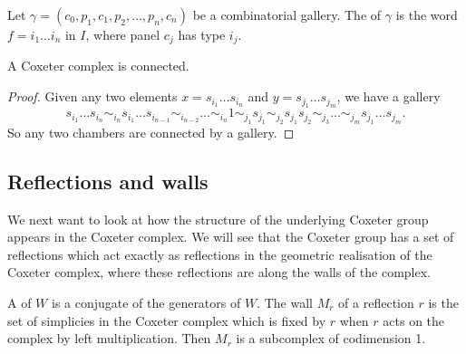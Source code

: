 \documentclass[11pt]{article}
\begin{document}
\begin{definition}\label{type}
    Let $\gamma=(c_0,p_1,c_1,p_2,\hdots  ,p_n,c_n)$ be a combinatorial gallery. The  of $\gamma$ is the word $f=i_1\hdots i_n$ in $I$, where panel $c_j$ has type $i_j$. 
\end{definition}

\begin{lemma}
    A Coxeter complex is connected.
\end{lemma}

\begin{proof}
    Given any two elements $x=s_{i_1}\hdots s_{i_n}$ and $y=s_{j_1}\hdots s_{j_m}$, we have a gallery
    \[s_{i_1}\hdots s_{i_n}\sim_{i_n}s_{i_1}\hdots s_{i_{n-1}}\sim_{i_{n-2}}\hdots \sim_{i_n} 1 \sim_{j_1}s_{j_1}\sim_{j_2}s_{j_1}s_{j_2}\sim_{j_3}\hdots\sim_{j_m}s_{j_1}\hdots s_{j_m}.\]
    So any two chambers are connected by a gallery.
\end{proof}




\subsection{Reflections and walls}
We next want to look at how the structure of the underlying Coxeter group appears in the Coxeter complex. We will see that the Coxeter group has a set of reflections which act exactly as reflections in the geometric realisation of the Coxeter complex, where these reflections are along the walls of the complex. 

\begin{definition}
    A  of $W$ is a conjugate of the generators of $W$. The wall $M_r$ of a reflection $r$ is the set of simplicies in the Coxeter complex which is fixed by $r$ when $r$ acts on the complex by left multiplication. Then $M_r$ is a subcomplex of codimension 1.
\end{definition}
\end{document}

